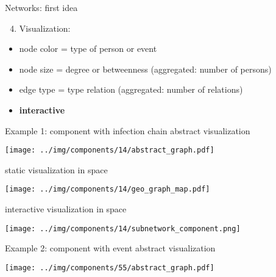 \documentclass[
  8pt,
  ignorenonframetext,
]{beamer}
\providecommand{\tightlist}{%
  \setlength{\itemsep}{0pt}\setlength{\parskip}{0pt}}
\begin{document}
\begin{frame}{Networks: first idea}
\begin{enumerate}
\setcounter{enumi}{3}
\tightlist
\item
  Visualization:
\end{enumerate}

\begin{itemize}
\tightlist
\item
  node color = type of person or event
\item
  node size = degree or betweenness (aggregated: number of persons)
\item
  edge type = type relation (aggregated: number of relations)
\item
  \textbf{interactive}
\end{itemize}

\normalsize
\end{frame}

\begin{frame}{Example 1: component with infection chain}
\protect\hypertarget{example-1-component-with-infection-chain}{}
abstract visualization

\begin{center}
\texttt{[image: ../img/components/14/abstract\_graph.pdf]}
\end{center}
\end{frame}

\begin{frame}
static visualization in space

\begin{center}
\texttt{[image: ../img/components/14/geo\_graph\_map.pdf]}
\end{center}
\end{frame}

\begin{frame}
interactive visualization in space

\begin{center}
\texttt{[image: ../img/components/14/subnetwork\_component.png]}
\end{center}
\end{frame}

\begin{frame}{Example 2: component with event}
\protect\hypertarget{example-2-component-with-event}{}
abstract visualization

\begin{center}
\texttt{[image: ../img/components/55/abstract\_graph.pdf]}
\end{center}
\end{frame}
\end{document}
